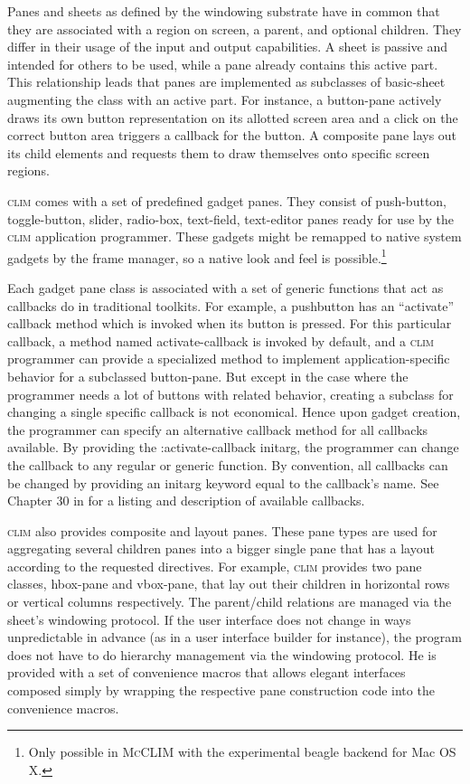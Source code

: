 \documentclass[twocolumn,a4paper]{article}
\newcommand {\code}[1]{{\sffamily #1}}
\newcommand {\CLIM}{\textsc{clim}}
\newcommand {\mcclim}{\textsc{McCLIM}}
\let\class\code
\let\method\code
\let\keyword\code
\begin{document}
Panes and sheets as defined by the windowing substrate have in common
that they are associated with a region on screen, a parent, and
optional children. They differ in their usage of the input and output
capabilities. A sheet is passive and intended for others to be used,
while a pane already contains this active part. This relationship
leads that panes are implemented as subclasses of \class{basic-sheet}
augmenting the class with an active part. For instance, a button-pane
actively draws its own button representation on its allotted screen
area and a click on the correct button area triggers a callback for
the button. A composite pane lays out its child elements and
requests them to draw themselves onto specific screen regions.

\CLIM{} comes with a set of predefined gadget panes. They consist of
push-button, toggle-button, slider, radio-box, text-field, text-editor
panes ready for use by the \CLIM{} application programmer. These
gadgets might be remapped to native system gadgets by the frame
manager, so a native look and feel is possible.\footnote{Only possible
  in \mcclim{} with the experimental beagle backend for Mac OS X.}

Each gadget pane class is associated with a set of generic functions
that act as callbacks do in traditional toolkits. For example, a pushbutton
has an ``activate'' callback method which is invoked when its button
is pressed. For this particular callback, a method named
\method{activate-callback} is invoked by default, and a \CLIM{}
programmer can provide a specialized method to implement
application-specific behavior for a subclassed button-pane. But except
in the case where the programmer needs a lot of buttons with related
behavior, creating a subclass for changing a single specific callback
is not economical. Hence upon gadget creation, the programmer can
specify an alternative callback method for all callbacks available. By
providing the \keyword{:activate-callback} initarg, the programmer can
change the callback to any regular or generic function. By convention,
all callbacks can be changed by providing an initarg keyword equal to
the callback's name. See Chapter 30 in \cite{clim-spec} for a listing
and description of available callbacks.

\CLIM{} also provides composite and layout panes. These pane types are
used for aggregating several children panes into a bigger single pane
that has a layout according to the requested directives.  For example,
\CLIM{} provides two pane classes, \class{hbox-pane} and
\class{vbox-pane}, that lay out their children in horizontal rows or
vertical columns respectively. The parent/child relations are managed
via the sheet's windowing protocol. If the user interface does not
change in ways unpredictable in advance (as in a user interface
builder for instance), the program does not have to do hierarchy
management via the windowing protocol. He is provided with a set of
convenience macros that allows elegant interfaces composed simply by
wrapping the respective pane construction code into the convenience
macros.
\end{document}
